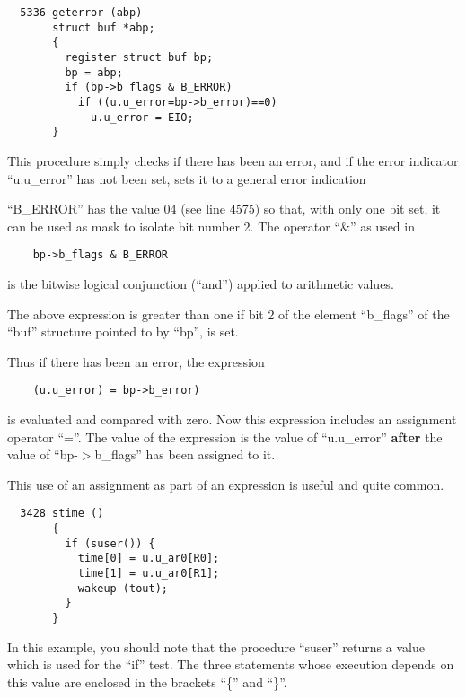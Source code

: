
\begin{verbatim}
  5336 geterror (abp)
       struct buf *abp;
       {
         register struct buf bp;
         bp = abp;
         if (bp->b flags & B_ERROR)
           if ((u.u_error=bp->b_error)==0)
             u.u_error = EIO;
       }
\end{verbatim}



This procedure simply checks if there
has been an error, and if the error
indicator ``u.u\_error'' has not been set,
sets it to a general error indication

``B\_ERROR'' has the value 04 (see line
4575) so that, with only one bit set,
it can be used as mask to isolate bit
number 2. The operator ``\&'' as used in

\begin{verbatim}
    bp->b_flags & B_ERROR
\end{verbatim}

\noindent is the bitwise logical conjunction
(``and'') applied to arithmetic values.

The above expression is greater than
one if bit 2 of the element ``b\_flags''
of the ``buf'' structure pointed to by
``bp'', is set.

Thus if there has been an error, the
expression

\begin{verbatim}
    (u.u_error) = bp->b_error)
\end{verbatim}

\noindent is evaluated and compared with zero.
Now this expression includes an assignment operator ``=''.
The value of the expression is the value of ``u.u\_error''
{\bf after} the value of ``bp-$>$b\_flags'' has
been assigned to it.

This use of an assignment as part of an
expression is useful and quite common.



\begin{verbatim}
  3428 stime ()
       {
         if (suser()) {
           time[0] = u.u_ar0[R0];
           time[1] = u.u_ar0[R1];
           wakeup (tout);
         }
       }
\end{verbatim}

In this example, you should note that
the procedure ``suser'' returns a value
which is used for the ``if'' test. The
three statements whose execution
depends on this value are enclosed in
the brackets ``\{'' and ``\}''.


